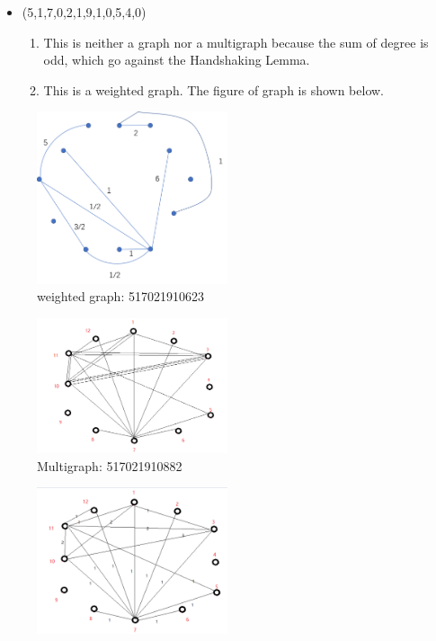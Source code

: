\documentclass[12pt,a4]{article}
\begin{document}
\begin{exercise}
\begin{solution}
\begin{itemize}
\begin{enumerate}
 	\end{enumerate}

 \item (5,1,7,0,2,1,9,1,0,5,4,0)
 	\begin{enumerate}
 		\item This is neither a graph nor a multigraph because the sum of degree is odd, which go against the Handshaking Lemma.
 		\item This is a weighted graph. The figure of graph is shown below.
 		
 	\end{enumerate}
  \end{itemize}
  \begin{figure}
        \centering
        \includegraphics[width=0.5\textwidth]{figures/sty.png}\caption{weighted graph: 517021910623}\label{fig-sty}
      \end{figure}
  \begin{figure}[!htb]
      \centering
      \includegraphics[width=0.5\textwidth]{4.jpg}
      \caption{Multigraph: 517021910882}
  \end{figure}
  \begin{figure}[!htb]
      \centering
      \includegraphics[width=0.5\textwidth]{5.jpg}

\end{figure}
\end{solution}
\end{exercise}
\end{document}
